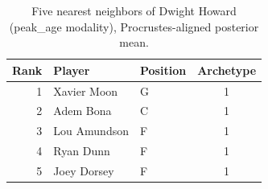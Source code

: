\begin{table}[htbp]
  \centering\small
  \begin{tabular}{rllc}
    \toprule
    Rank & Player & Position & Archetype \\
    \midrule
    1 & Xavier Moon & G & 1 \\
    2 & Adem Bona & C & 1 \\
    3 & Lou Amundson & F & 1 \\
    4 & Ryan Dunn & F & 1 \\
    5 & Joey Dorsey & F & 1 \\
    \bottomrule
  \end{tabular}
  \caption{Five nearest neighbors of Dwight Howard (peak_age modality), Procrustes-aligned posterior mean.}
  \label{tab:Dwight_Howard_neighbors_peak_age}
\end{table}

